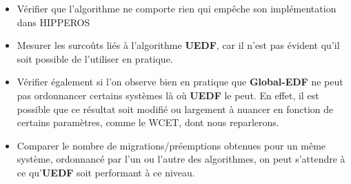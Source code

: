 	\begin{itemize}
		\item Vérifier que l'algorithme ne comporte rien qui empêche son implémentation dans 
		HIPPEROS
		\item Mesurer les surcoûts liés à l'algorithme \textbf{UEDF}, car il n'est pas 
		évident qu'il soit possible de l'utiliser en pratique.
		\item Vérifier également si l'on observe bien en pratique que \textbf{Global-EDF} ne 
		peut pas ordonnancer certains systèmes là où \textbf{UEDF} le peut.
		En effet, il est possible que ce résultat soit modifié ou largement à nuancer en 
		fonction de certains paramètres, comme le WCET, dont nous reparlerons.
		\item Comparer le nombre de migrations/préemptions obtenues pour un même système, ordonnancé 
		par l'un ou l'autre des algorithmes, on peut s'attendre à ce qu'\textbf{UEDF} soit performant à ce niveau.
	\end{itemize}

